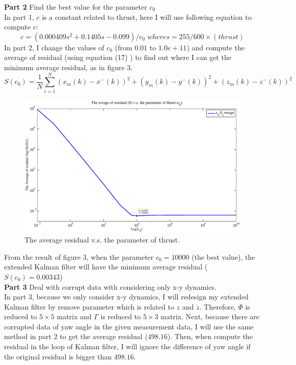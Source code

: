 \documentclass[10pt,letterpaper]{article}
\begin{document}
\noindent \textbf{Part 2} Find the best value for the parameter $c_0$\\
In part 1, $c$ is a constant related to thrust, here I will use following equation to compute $c$:
\begin{equation}
	c= (0.000409s^2+0.1405s-0.099)/c_0\;where s=255/600\times (thrust)
\end{equation}
In part 2, I change the values of $c_0$ (from $0.01$ to $1.0e+11$) and compute the average of residual (using 
equation (17) ) to find out where I can get the minimum average residual, as in figure 3.
\begin{equation}
	S(c_0)=\frac{1}{N}\sum\limits_{i = 1}^N {(x_m(k)-x^-(k))^2+(y_m(k)-y^-(k))^2+(z_m(k)-z^-(k))^2} 
\end{equation} 
  \begin{figure}[H]
	 \begin{center}
	 	\includegraphics[width=\textwidth]{S_c0.eps}
	 	\caption{The average residual  v.s. the parameter of thrust.}
	 \end{center}
 \end{figure}
From the result of figure 3, when the parameter $c_0=10000$ (the best value), the extended Kalman filter will 
have the minimum average residual ($S(c_0) = 0.00343$)\\
\noindent \textbf{Part 3} Deal with corrupt data with considering only x-y dynamics.\\
In part 3, because we only consider x-y dynamics, I will redesign my extended Kalman filter by remove 
parameter which is related to $z$ and $\dot{z}$. Therefore, $\Phi$ is reduced to $5\times5$ matrix and 
$\Gamma$ is reduced to $5\times3$ matrix. Next, because there are corrupted data of yaw angle in the given 
measurement data, I will use the same method in part 2 to get the average residual ($498.16$). Then, when 
compute the residual in the loop of Kalman filter, I will ignore the difference of yaw angle if the original residual 
is bigger than $498.16$. 
\end{document}
